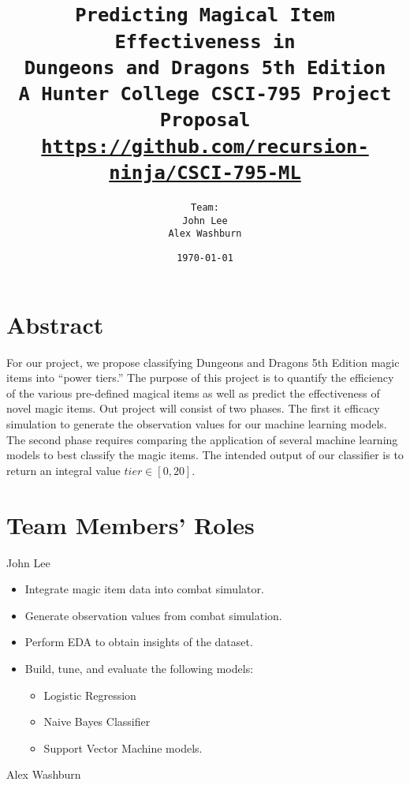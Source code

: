 \documentclass[12pt]{diazessay}
\title{\texttt{\LARGE{Predicting Magical Item Effectiveness in \\Dungeons and Dragons 5th Edition} \\\vspace{-0.35cm} {\large A Hunter College CSCI-795 Project Proposal}\\\normalsize\url{https://github.com/recursion-ninja/CSCI-795-ML}}} %
\author{\texttt{{\Huge Team:}\\\vspace*{-0.5em} 
		John Lee \\\vspace*{-0.5em} 
		Alex Washburn}} %
\date{\texttt{\today}} %
\begin{document}
\maketitle %

\vspace{-1cm}
\section*{Abstract}


For our project, we propose classifying Dungeons and Dragons 5th Edition magic items into ``power tiers.'' The purpose of this project is to quantify the efficiency of the various pre-defined magical items as well as predict the effectiveness of novel magic items. Out project will consist of two phases. The first it efficacy simulation to generate the observation values for our machine learning models. The second phase requires comparing the application of several machine learning models to best classify the magic items. The intended output of our classifier is to return an integral value $tier \in [0, 20]$.

\section*{Team Members' Roles}

John Lee

\begin{itemize}
	
	\item Integrate magic item data into combat simulator.
	\item Generate observation values from combat simulation.
	\item Perform EDA to obtain insights of the dataset.
	\item Build, tune, and evaluate the following models:
	\begin{itemize}
		\item Logistic Regression
		\item Naive Bayes Classifier
		\item Support Vector Machine models.
	\end{itemize}
	
\end{itemize}

Alex Washburn
\end{document}
